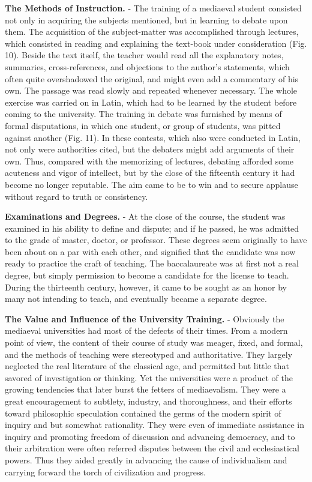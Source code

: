 \documentclass[]{book}
\begin{document}
\textbf{The Methods of Instruction.} - The training of a mediaeval student consisted not only in acquiring the subjects mentioned, but in learning to debate upon them. The acquisition of the subject-matter was accomplished through lectures, which consisted in reading and explaining the text-book under consideration (Fig. 10). Beside the text itself, the teacher would read all the explanatory notes, summaries, cross-references, and objections to the author's statements, which often quite overshadowed the original, and might even add a commentary of his own. The passage was read slowly and repeated whenever necessary. The whole exercise was carried on in Latin, which had to be learned by the student before coming to the university. The training in debate was furnished by means of formal disputations, in which one student, or group of students, was pitted against another (Fig. 11). In these contests, which also were conducted in Latin, not only were authorities cited, but the debaters might add arguments of their own. Thus, compared with the memorizing of lectures, debating afforded some acuteness and vigor of intellect, but by the close of the fifteenth century it had become no longer reputable. The aim came to be to win and to secure applause without regard to truth or consistency.

\textbf{Examinations and Degrees.} - At the close of the course, the student was examined in his ability to define and dispute; and if he passed, he was admitted to the grade of master, doctor, or professor. These degrees seem originally to have been about on a par with each other, and signified that the candidate was now ready to practice the craft of teaching. The baccalaureate was at first not a real degree, but simply permission to become a candidate for the license to teach. During the thirteenth century, however, it came to be sought as an honor by many not intending to teach, and eventually became a separate degree.

\textbf{The Value and Influence of the University Training.} - Obviously the mediaeval universities had most of the defects of their times. From a modern point of view, the content of their course of study was meager, fixed, and formal, and the methods of teaching were stereotyped and authoritative. They largely neglected the real literature of the classical age, and permitted but little that savored of investigation or thinking. Yet the universities were a product of the growing tendencies that later burst the fetters of mediaevalism. They were a great encouragement to subtlety, industry, and thoroughness, and their efforts toward philosophic speculation contained the germs of the modern spirit of inquiry and but somewhat rationality. They were even of immediate assistance in inquiry and promoting freedom of discussion and advancing democracy, and to their arbitration were often referred disputes between the civil and ecclesiastical powers. Thus they aided greatly in advancing the cause of individualism and carrying forward the torch of civilization and progress.
\end{document}
